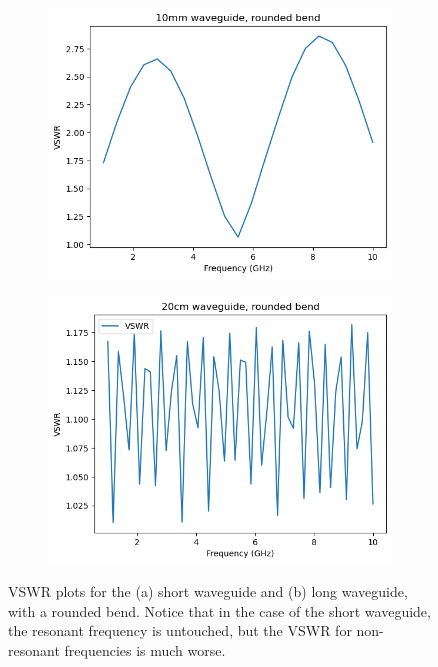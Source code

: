 \begin{figure}
	\centering
	\begin{subfigure}{0.4\textwidth}
		\includegraphics[scale=0.5]{images/plots/short-finitecond-bend-round.png}
		\caption{}
		\label{short-finitecond-bend-round}
	\end{subfigure}
	\hspace{2cm}
	\begin{subfigure}{0.4\textwidth}
		\includegraphics[scale=0.5]{images/plots/long-finitecond-bend-round.png}
		\caption{}
		\label{long-finitecond-bend-round}
	\end{subfigure}
	\caption{VSWR plots for the (a) short waveguide and (b) long waveguide, with a rounded bend. Notice that
	in the case of the short waveguide, the resonant frequency is untouched, but the VSWR for non-resonant
frequencies is much worse.}
	\label{round-bend-plot}
\end{figure}

